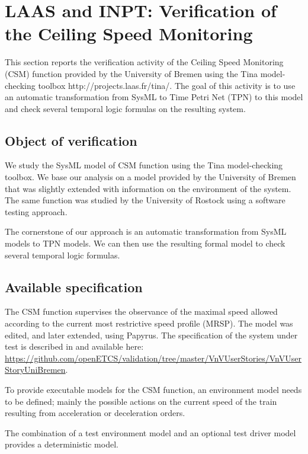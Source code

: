 \newcommand{\uml}{UML\xspace}
\newcommand{\marte}{MARTE\xspace}
\newcommand{\tpn}{TPN\xspace}
\newcommand{\sysml}{SysML\xspace}

\section{LAAS and INPT: Verification of the  Ceiling Speed Monitoring}
\label{sec:laas}
This section reports the verification activity of the Ceiling Speed Monitoring (CSM) function provided by the University of Bremen using the Tina model-checking toolbox {http://projects.laas.fr/tina/}. The goal of this activity is to use an automatic transformation from SysML to Time Petri Net (TPN) to this model and check several temporal logic formulas on the resulting system.  

\subsection{Object of verification}

We study the SysML model of CSM function using the Tina model-checking toolbox. 
We base our analysis on a model provided by the University of Bremen that was slightly
extended with information on the environment of the system. The same
function was studied by the University of Rostock using a software
testing approach.

The cornerstone of our approach is an automatic transformation from
SysML models to TPN models. We can then use the resulting formal
model to check several temporal logic formulas.

\subsection{Available specification}

The CSM function supervises the observance of the maximal speed allowed according to the current most restrictive speed profile (MRSP). The model was edited, and later extended, using Papyrus. 
The specification of the system under test is described in \cite{csmwp4} and available here: \url{https://github.com/openETCS/validation/tree/master/VnVUserStories/VnVUserStoryUniBremen}.  

To provide executable models for the CSM function, an environment model needs to be defined; mainly the possible actions on the current speed of the train resulting from 
acceleration or deceleration orders. 

The combination of a test environment model and an optional test driver
model provides a deterministic model. 

